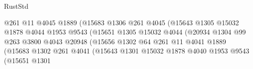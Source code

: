\begin{lexlean}{RustStd}
\begin{coremodule}
                                            @261
                                            @11
                                            @4045
                                            @1889
                                            (@15683
                                              @1306
                                              @261
                                              @4045
                                              (@15643
                                                @1305
                                                @15032
                                                @1878
                                                @4044
                                                @1953
                                                @9543
                                                (@15651
                                                  @1305
                                                  @15032
                                                  @4044
                                                  (@20934
                                                    @1304
                                                    @99
                                                    @263
                                                    @3800
                                                    @4043
                                                    @20948
                                                    (@15656
                                                      @1302
                                                      @64
                                                      @261
                                                      @11
                                                      @4041
                                                      @1889
                                                      (@15683
                                                        @1302
                                                        @261
                                                        @4041
                                                        (@15643
                                                          @1301
                                                          @15032
                                                          @1878
                                                          @4040
                                                          @1953
                                                          @9543
                                                          (@15651
                                                            @1301

\end{coremodule}
\end{lexlean}
